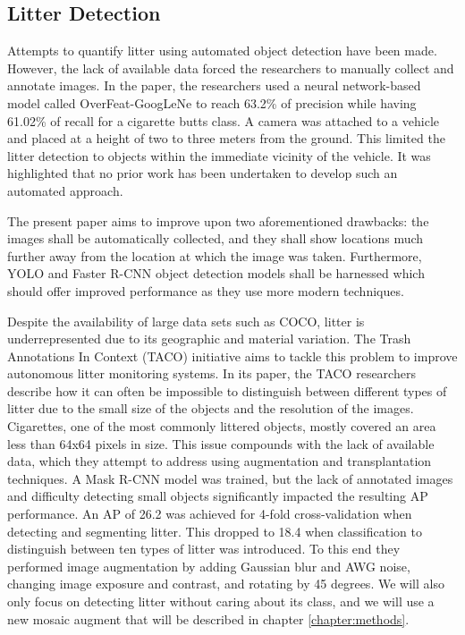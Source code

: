 \documentclass{thesis}
\begin{document}
\subsection{Litter Detection}

Attempts to quantify litter using automated object detection have been made\cite{cvstreets}. However, the lack of available data forced the researchers to manually collect and annotate images. In the paper, the researchers used a neural network-based model called OverFeat-GoogLeNe to reach 63.2\% of precision while having 61.02\% of recall for a cigarette butts class. A camera was attached to a vehicle and placed at a height of two to three meters from the ground. This limited the litter detection to objects within the immediate vicinity of the vehicle. It was highlighted that no prior work has been undertaken to develop such an automated approach.

The present paper aims to improve upon two aforementioned drawbacks: the images shall be automatically collected, and they shall show locations much further away from the location at which the image was taken. Furthermore, YOLO and Faster R-CNN object detection models shall be harnessed which should offer improved performance as they use more modern techniques.

Despite the availability of large data sets such as COCO\cite{lin2015microsoft}, litter is underrepresented due to its geographic and material variation. The Trash Annotations In Context (TACO) initiative aims to tackle this problem to improve autonomous litter monitoring systems\cite{DBLP:journals/corr/abs-2003-06975}. In its paper, the TACO researchers describe how it can often be impossible to distinguish between different types of litter due to the small size of the objects and the resolution of the images. Cigarettes, one of the most commonly littered objects, mostly covered an area less than 64x64 pixels in size. This issue compounds with the lack of available data, which they attempt to address using augmentation and transplantation techniques. A Mask R-CNN model was trained, but the lack of annotated images and difficulty detecting small objects significantly impacted the resulting AP performance. An AP of 26.2 was achieved for 4-fold cross-validation when detecting and segmenting litter. This dropped to 18.4 when classification to distinguish between ten types of litter was introduced. To this end they performed image augmentation by adding Gaussian blur and AWG noise, changing image
exposure and contrast, and rotating by 45 degrees. We will also only focus on detecting litter without caring about its class, and we will use a new mosaic augment that will be described in chapter \ref{chapter:methods}.
\end{document}
